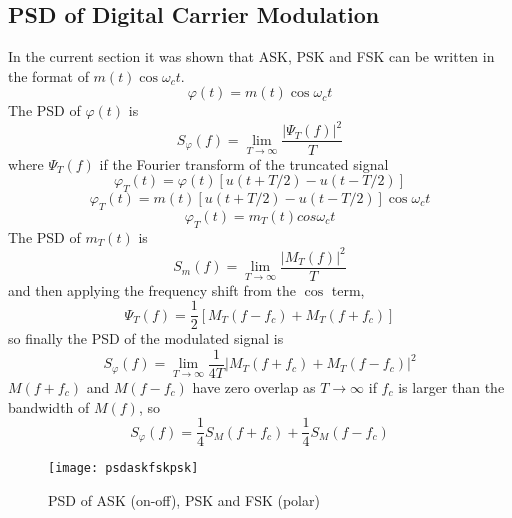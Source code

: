 \documentclass{article}
\begin{document}
    \subsection{PSD of Digital Carrier Modulation}
    In the current section it was shown that ASK, PSK and FSK can be written in the format of 
    $m(t)\cos\omega_ct$. 
    \begin{equation}
        \varphi(t) = m(t)\cos\omega_ct
    \end{equation}
    The PSD of $\varphi(t)$ is
    \begin{equation}
        S_{\varphi}(f) = \lim_{T \rightarrow \infty} \frac{|\Psi_T (f)|^2}{T}
    \end{equation}
    where $\Psi_T (f)$ if the Fourier transform of the truncated signal
    \begin{equation}
        \varphi_T(t) = \varphi(t)[u(t+T/2) - u(t-T/2)]
    \end{equation}
    \begin{equation}
        \varphi_T(t) = m(t)[u(t+T/2) - u(t-T/2)]\cos\omega_ct
    \end{equation}
    \begin{equation}
        \varphi_T(t) = m_T(t)cos\omega_ct
    \end{equation}
    The PSD of $m_T(t)$ is
    \begin{equation}
        S_m(f) = \lim_{T \rightarrow \infty} \frac{|M_T(f)|^2}{T}
    \end{equation}
    and then applying the frequency shift from the $\cos$ term,
    \begin{equation}
        \Psi_T(f) = \frac{1}{2}[M_T(f-f_c) + M_T(f+f_c)]
    \end{equation}
    so finally the PSD of the modulated signal is
    \begin{equation}
        S_{\varphi}(f) = \lim_{T\rightarrow\infty} \frac{1}{4T}|M_T(f+f_c) + M_T(f-f_c)|^2
    \end{equation}
    $M(f+f_c)$ and $M(f-f_c)$ have zero overlap as $T\rightarrow\infty$ if $f_c$ is larger than the 
    bandwidth of $M(f)$, so
    \begin{equation}
        S_{\varphi}(f) = \frac{1}{4}S_M(f+f_c) + \frac{1}{4}S_M(f-f_c)
    \end{equation}

    \begin{figure}[h]
        \centering
        \texttt{[image: psdaskfskpsk]}
        \caption{PSD of ASK (on-off), PSK and FSK (polar)}
    \end{figure}
\end{document}
